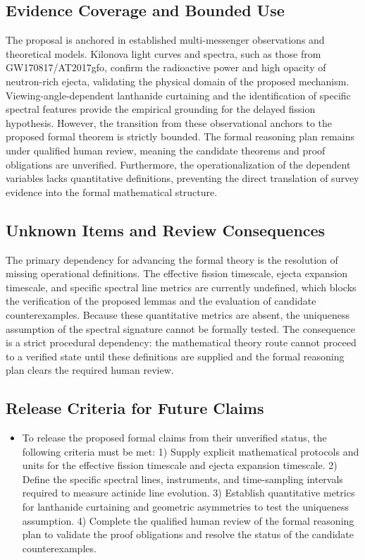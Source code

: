 \documentclass[conference]{IEEEtran}
\begin{document}
\subsection{Evidence Coverage and Bounded Use}
The proposal is anchored in established multi-messenger observations and theoretical models. Kilonova light curves and spectra, such as those from GW170817/AT2017gfo, confirm the radioactive power and high opacity of neutron-rich ejecta, validating the physical domain of the proposed mechanism. Viewing-angle-dependent lanthanide curtaining and the identification of specific spectral features provide the empirical grounding for the delayed fission hypothesis. However, the transition from these observational anchors to the proposed formal theorem is strictly bounded. The formal reasoning plan remains under qualified human review, meaning the candidate theorems and proof obligations are unverified. Furthermore, the operationalization of the dependent variables lacks quantitative definitions, preventing the direct translation of survey evidence into the formal mathematical structure.~\cite{cite_2bf3a687e25803e4,cite_492ec5910d5efd57,cite_612290131318c0d4}

\subsection{Unknown Items and Review Consequences}
The primary dependency for advancing the formal theory is the resolution of missing operational definitions. The effective fission timescale, ejecta expansion timescale, and specific spectral line metrics are currently undefined, which blocks the verification of the proposed lemmas and the evaluation of candidate counterexamples. Because these quantitative metrics are absent, the uniqueness assumption of the spectral signature cannot be formally tested. The consequence is a strict procedural dependency: the mathematical theory route cannot proceed to a verified state until these definitions are supplied and the formal reasoning plan clears the required human review.

\subsection{Release Criteria for Future Claims}
\begin{itemize}
\item To release the proposed formal claims from their unverified status, the following criteria must be met: 1) Supply explicit mathematical protocols and units for the effective fission timescale and ejecta expansion timescale. 2) Define the specific spectral lines, instruments, and time-sampling intervals required to measure actinide line evolution. 3) Establish quantitative metrics for lanthanide curtaining and geometric asymmetries to test the uniqueness assumption. 4) Complete the qualified human review of the formal reasoning plan to validate the proof obligations and resolve the status of the candidate counterexamples.
\end{itemize}

\end{document}
